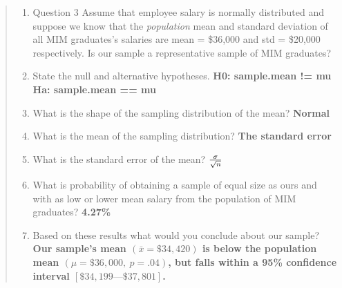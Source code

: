 \documentclass[11pt]{article}
\providecommand{\tightlist}{%
      \setlength{\itemsep}{0pt}\setlength{\parskip}{0pt}}
\begin{document}
    \begin{quote}
\begin{enumerate}
\def\labelenumi{\arabic{enumi}.}
\setcounter{enumi}{2}
\tightlist
\item
  Question 3 Assume that employee salary is normally distributed and
  suppose we know that the \emph{population} mean and standard deviation
  of all MIM graduates's salaries are mean = \$36,000 and std = \$20,000
  respectively. Is our sample a representative sample of MIM graduates?
\item
  State the null and alternative hypotheses.\textbf{ H0: sample.mean !=
  mu Ha: sample.mean == mu}
\item
  What is the shape of the sampling distribution of the mean?\textbf{
  Normal}
\item
  What is the mean of the sampling distribution?\textbf{ The standard
  error}
\item
  What is the standard error of the mean?\textbf{
  \(\sigma\over{\sqrt{n}}\)}
\item
  What is probability of obtaining a sample of equal size as ours and
  with as low or lower mean salary from the population of MIM
  graduates?\textbf{ 4.27\%}
\item
  Based on these results what would you conclude about our
  sample?\textbf{ Our sample's mean \((\bar{x} = \$34,420)\) is below
  the population mean \((\mu = \$36,000,\ p = .04)\), but falls within a
  95\% confidence interval \([\$34,199 — \$37,801]\).}
\end{enumerate}
\end{quote}
\end{document}
